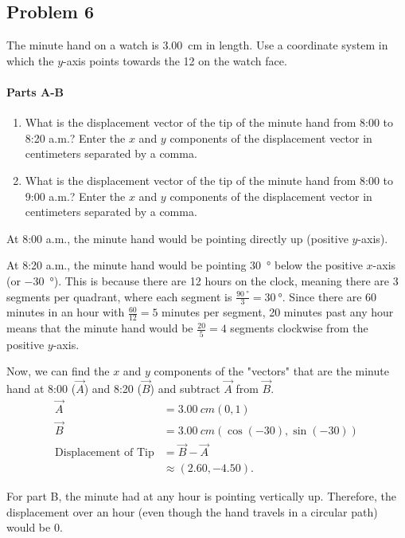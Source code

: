 
\newpage

\subsection{Problem 6}

The minute hand on a watch is \SI{3.00}{cm} in length. Use a coordinate system in which the $y$-axis points towards the 12 on the watch face.

\setcounter{partcounter}{2}
\paragraph{Parts A-B}

\begin{enumerate}[label=\Alph*.]
	\item What is the displacement vector of the tip of the minute hand from 8:00 to 8:20 a.m.? Enter the $x$ and $y$ components of the displacement vector in centimeters separated by a comma.
	\item What is the displacement vector of the tip of the minute hand from 8:00 to 9:00 a.m.? Enter the $x$ and $y$ components of the displacement vector in centimeters separated by a comma.
\end{enumerate}

\begin{solution}
	At 8:00 a.m., the minute hand would be pointing directly up (positive $y$-axis).

	At 8:20 a.m., the minute hand would be pointing \SI{30}{\degree} below the positive $x$-axis (or \SI{-30}{\degree}). This is because there are 12 hours on the clock, meaning there are 3 segments per quadrant, where each segment is $\frac{\SI{90}{\degree}}{3} = \SI{30}{\degree}$. Since there are 60 minutes in an hour with $\frac{60}{12} = 5$ minutes per segment, 20 minutes past any hour means that the minute hand would be $\frac{20}{5} = 4$ segments clockwise from the positive $y$-axis.

	Now, we can find the $x$ and $y$ components of the "vectors" that are the minute hand at 8:00 ($\vec{A}$) and 8:20 ($\vec{B}$) and subtract $\vec{A}$ from $\vec{B}$.
	\begin{align*}
		\vec{A} &= \SI{3.00}{cm} \left( 0, 1 \right) \\
		\vec{B} &= \SI{3.00}{cm} \left( \cos \left( -30 \right), \sin \left( -30 \right) \right) \\
		\text{Displacement of Tip} &= \vec{B} - \vec{A} \\
		&\approx \left( 2.60, -4.50 \right)
		.\end{align*}

	For part B, the minute had at any hour is pointing vertically up. Therefore, the displacement over an hour (even though the hand travels in a circular path) would be 0.
\end{solution}
